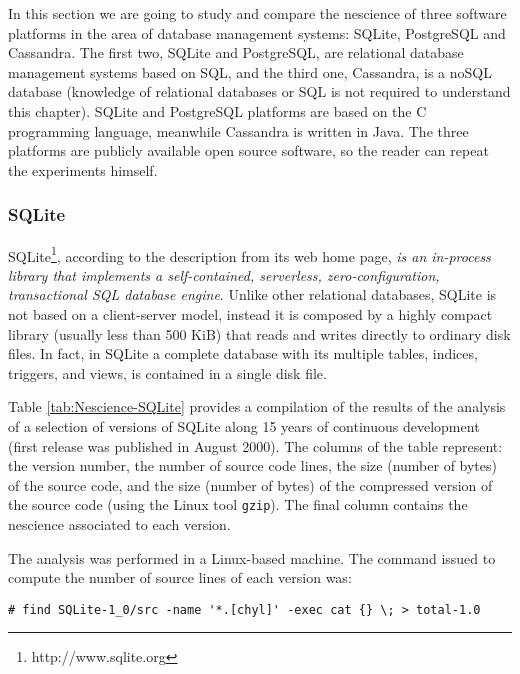 In this section we are going to study and compare the nescience of three software platforms in the area of database management systems: SQLite, PostgreSQL and Cassandra. The first two, SQLite and PostgreSQL, are relational database management systems based on SQL, and the third one, Cassandra, is a noSQL database (knowledge of relational databases or SQL is not required to understand this chapter). SQLite and PostgreSQL platforms are based on the C programming language, meanwhile Cassandra is written in Java. The three platforms are publicly available open source software, so the reader can repeat the experiments himself.

\subsubsection*{SQLite}

SQLite\footnote{http://www.sqlite.org}, according to the description from its web home page, \emph{is an in-process library that implements a self-contained, serverless, zero-configuration, transactional SQL database engine}. Unlike other relational databases, SQLite is not based on a client-server model, instead it is composed by a highly compact library (usually less than 500 KiB) that reads and writes directly to ordinary disk files. In fact, in SQLite a complete database with its multiple tables, indices, triggers, and views, is contained in a single disk file.

Table \ref{tab:Nescience-SQLite} provides a compilation of the results of the analysis of a selection of versions of SQLite along 15 years of continuous development (first release was published in August 2000). The columns of the table represent: the version number, the number of source code lines, the size (number of bytes) of the source code, and the size (number of bytes) of the compressed version of the source code (using the Linux tool {\tt gzip}). The final column contains the nescience associated to each version.

The analysis was performed in a Linux-based machine. The command issued to compute the number of source lines of each version was:

\begin{verbatim}
# find SQLite-1_0/src -name '*.[chyl]' -exec cat {} \; > total-1.0
\end{verbatim}

